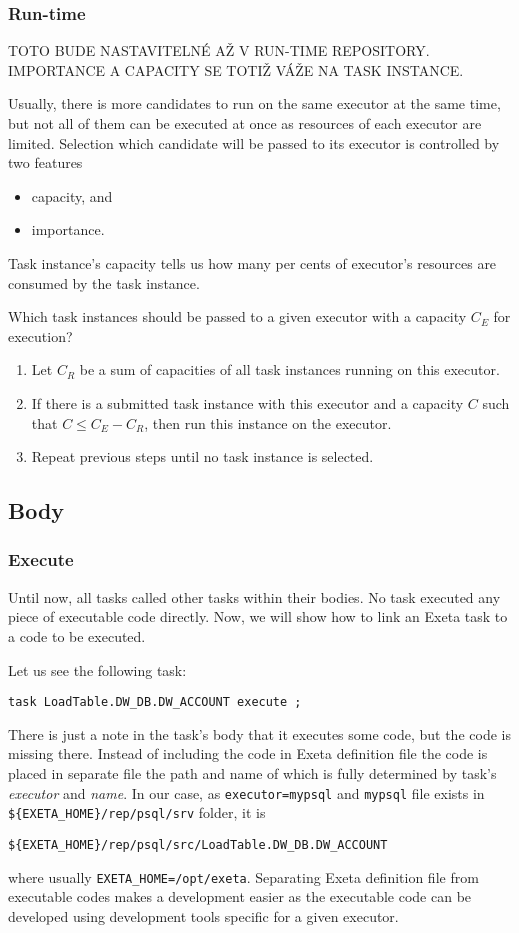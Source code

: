 \documentclass[a4paper,12pt,english,oneside]{book}
\newcommand{\exeta}{Exeta\xspace}
\begin{document}
\subsubsection{Run-time}

TOTO BUDE NASTAVITELNÉ AŽ V RUN-TIME REPOSITORY. IMPORTANCE A CAPACITY SE TOTIŽ VÁŽE NA TASK INSTANCE.

Usually, there is more candidates to run on the same executor at the same time, but not all of them can be executed at once as resources of each executor are limited. Selection which candidate will be passed to its executor is controlled by two features
\begin{itemize}
    \item capacity, and
    \item importance.
\end{itemize}
Task instance's capacity tells us how many per cents of executor's resources are consumed by the task instance.

Which task instances should be passed to a given executor with a capacity $C_E$ for execution?
\begin{enumerate}
    \item Let $C_R$ be a sum of capacities of all task instances running on this executor.
    \item If there is a submitted task instance with this executor and a capacity $C$ such that
    $C\le C_E-C_R$, then run this instance on the executor.
    \item Repeat previous steps until no task instance is selected.
\end{enumerate}

\subsection{Body}

\subsubsection{Execute}

Until now, all tasks called other tasks within their bodies. No task executed any piece of executable code directly. Now, we will show how to link an \exeta task to a code to be executed.

Let us see the following task:
\begin{verbatim}
task LoadTable.DW_DB.DW_ACCOUNT execute ;
\end{verbatim}
There is just a note in the task's body that it executes some code, but the code is missing there. Instead of including the code in \exeta definition file the code is placed in separate file the path and name of which is fully determined by task's \emph{executor} and \emph{name}. In our case, as \verb|executor=mypsql| and \verb|mypsql| file exists in \verb|${EXETA_HOME}/rep/psql/srv| folder, it is
\begin{verbatim}
${EXETA_HOME}/rep/psql/src/LoadTable.DW_DB.DW_ACCOUNT
\end{verbatim}
where usually \verb|EXETA_HOME=/opt/exeta|.
Separating \exeta definition file from executable codes makes a development easier as the executable code can be developed using development tools specific for a given executor.
\end{document}
